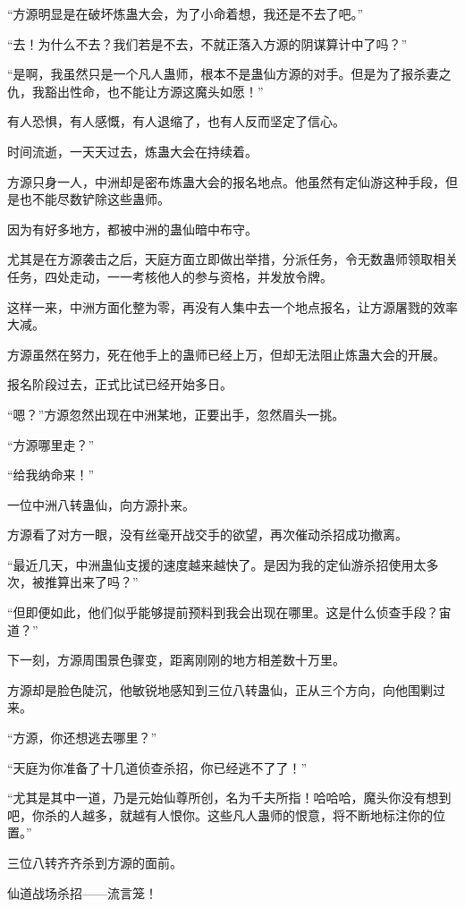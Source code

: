 \begin{this_body}
“方源明显是在破坏炼蛊大会，为了小命着想，我还是不去了吧。”

“去！为什么不去？我们若是不去，不就正落入方源的阴谋算计中了吗？”

“是啊，我虽然只是一个凡人蛊师，根本不是蛊仙方源的对手。但是为了报杀妻之仇，我豁出性命，也不能让方源这魔头如愿！”

有人恐惧，有人感慨，有人退缩了，也有人反而坚定了信心。

时间流逝，一天天过去，炼蛊大会在持续着。

方源只身一人，中洲却是密布炼蛊大会的报名地点。他虽然有定仙游这种手段，但是也不能尽数铲除这些蛊师。

因为有好多地方，都被中洲的蛊仙暗中布守。

尤其是在方源袭击之后，天庭方面立即做出举措，分派任务，令无数蛊师领取相关任务，四处走动，一一考核他人的参与资格，并发放令牌。

这样一来，中洲方面化整为零，再没有人集中去一个地点报名，让方源屠戮的效率大减。

方源虽然在努力，死在他手上的蛊师已经上万，但却无法阻止炼蛊大会的开展。

报名阶段过去，正式比试已经开始多日。

“嗯？”方源忽然出现在中洲某地，正要出手，忽然眉头一挑。

“方源哪里走？”

“给我纳命来！”

一位中洲八转蛊仙，向方源扑来。

方源看了对方一眼，没有丝毫开战交手的欲望，再次催动杀招成功撤离。

“最近几天，中洲蛊仙支援的速度越来越快了。是因为我的定仙游杀招使用太多次，被推算出来了吗？”

“但即便如此，他们似乎能够提前预料到我会出现在哪里。这是什么侦查手段？宙道？”

下一刻，方源周围景色骤变，距离刚刚的地方相差数十万里。

方源却是脸色陡沉，他敏锐地感知到三位八转蛊仙，正从三个方向，向他围剿过来。

“方源，你还想逃去哪里？”

“天庭为你准备了十几道侦查杀招，你已经逃不了了！”

“尤其是其中一道，乃是元始仙尊所创，名为千夫所指！哈哈哈，魔头你没有想到吧，你杀的人越多，就越有人恨你。这些凡人蛊师的恨意，将不断地标注你的位置。”

三位八转齐齐杀到方源的面前。

仙道战场杀招——流言笼！


\end{this_body}
